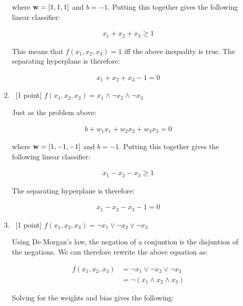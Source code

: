 \documentclass[12pt, fullpage,letterpaper]{article}
\begin{document}
\begin{enumerate}
\begin{enumerate}
			where ${\bf w} = [1, 1, 1]$ and $b=-1$. Putting this together gives the following linear classifier:
			
			\[
				\begin{split}
					x_1 + x_2 + x_3 \geq 1
				\end{split}
			\]
			
			This means that $f(x_1, x_2, x_3) = 1$ iff the above inequality is true. The separating hyperplane is therefore:
			
			\[
				\begin{split}
					x_1 + x_2 + x_3 - 1  = 0
				\end{split}
			\]
			
			
			

		
		\item~[1 point] $f(x_1, x_2, x_3) = x_1 \land \neg x_2 \land \neg x_3$
		
		Just as the problem above:
		
			\[
				\begin{split}
					b + w_1 x_1 + w_2 x_2 + w_3 x_3 = 0
				\end{split}
			\]
			
			where ${\bf w} = [1, -1, -1]$ and $b=-1$. Putting this together gives the following linear classifier:
			
			\[
				\begin{split}
					x_1 - x_2 - x_3 \geq 1
				\end{split}
			\]
			
			The separating hyperplane is therefore:
			
			\[
				\begin{split}
					 x_1 - x_2 - x_3 - 1  = 0
				\end{split}
			\]
		
		
		\item~[1 point] $f(x_1, x_2, x_3) = \neg x_1 \lor \neg x_2 \lor \neg x_3$ 
		
		Using De Morgan's law, the negation of a conjuntion is the disjuntion of the negations. We can therefore rewrite the above equation as:
		
			\[
				\begin{split}
					f(x_1, x_2, x_3) &= \neg x_1 \lor \neg x_2 \lor \neg x_3
					\\
					&= \neg ( x_1 \land  x_2 \land  x_3 )
				\end{split}
			\]
			
			Solving for the weights and bias gives the following:
			

\end{enumerate}
\end{enumerate}
\end{document}
